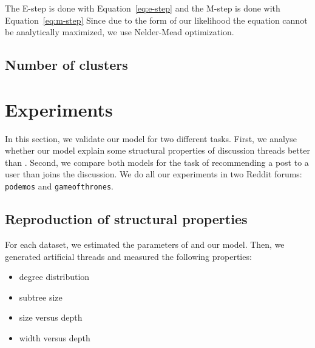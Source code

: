\documentclass[smallextended]{svjour3}          %
\begin{document}
The E-step is done with Equation~\ref{eq:e-step} and the M-step is done with Equation~\ref{eq:m-step} Since due to the form of our likelihood the equation cannot be analytically maximized, we use Nelder-Mead optimization.

\subsection{Number of clusters}
\section{Experiments}
In this section, we validate our model for two different tasks. First, we analyse whether our model explain some structural properties of discussion threads better than \cite{Gomez2012}. Second, we compare both models for the task of recommending a post to a user than joins the discussion. We do all our experiments in two Reddit forums: \texttt{podemos} and \texttt{gameofthrones}.

\subsection{Reproduction of structural properties} 
For each dataset, we estimated the parameters of \citep{Gomez2012} and our model. Then, we generated artificial threads and measured the following properties:

\begin{itemize}
\item degree distribution
\item subtree size
\item size versus depth
\item width versus depth
\end{itemize} 
\end{document}
